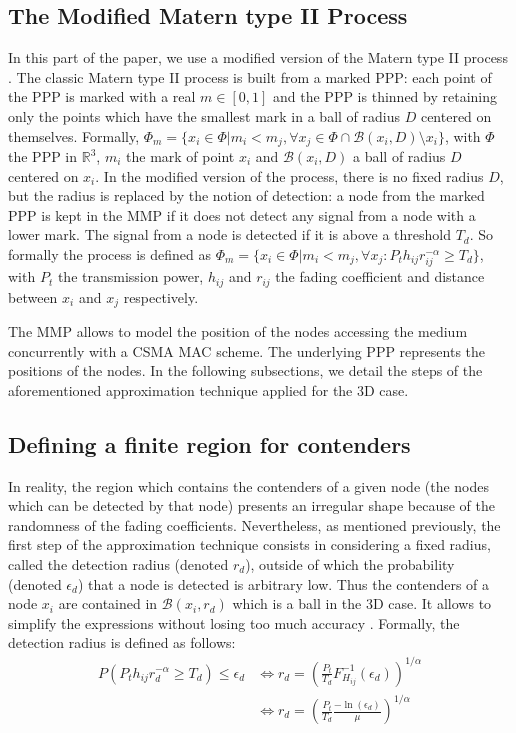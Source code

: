 \documentclass{sig-alternate-05-2015}
\begin{document}
\subsection{The Modified Matern type II Process}
\label{MMPmodelsec}

In this part of the paper, we use a modified version of the Matern type II process \cite{nguyen07}. The classic Matern type II process is built from a marked PPP: each point of the PPP is marked with a real $m\in [0,1]$ and the PPP is thinned by retaining only the points which have the smallest mark in a ball of radius $D$ centered on themselves. Formally, $\Phi_m = \{ x_i\in \Phi | m_{i} < m_{j}, \forall x_j \in \Phi \cap \mathcal{B}(x_i,D)\setminus x_i \}$, with $\Phi$ the PPP in $\mathbb{R}^3$, $m_i$ the mark of point $x_i$ and $\mathcal{B}(x_i,D)$ a ball of radius $D$ centered on $x_i$. In the modified version of the process, there is no fixed radius $D$, but the radius is replaced by the notion of detection: a node from the marked PPP is kept in the MMP if it does not detect any signal from a node with a lower mark. The signal from a node is detected if it is above a threshold $T_d$. So formally the process is defined as $\Phi_m = \{x_i\in \Phi | m_{i} < m_{j},  \forall x_j : P_t h_{ij} r_{ij}^{-\alpha} \geq T_d  \}$, with $P_t$ the transmission power, $h_{ij}$ and $r_{ij}$ the fading coefficient and distance between $x_i$ and $x_j$ respectively.

The MMP allows to model the position of the nodes accessing the medium concurrently with a CSMA MAC scheme. The underlying PPP represents the positions of the nodes. In the following subsections, we detail the steps of the aforementioned approximation technique applied for the 3D case.

\subsection{Defining a finite region for contenders}

In reality, the region which contains the contenders of a given node (the nodes which can be detected by that node) presents an irregular shape because of the randomness of the fading coefficients. Nevertheless, as mentioned previously, the first step of the approximation technique consists in considering a fixed radius, called the detection radius (denoted $r_d$), outside of which the probability (denoted $\epsilon_d$) that a node is detected is arbitrary low. Thus the contenders of a node $x_i$ are contained in $\mathcal{B}(x_i,r_d)$ which is a ball in the 3D case. It allows to simplify the expressions without losing too much accuracy \cite{elsawy13}. Formally, the detection radius is defined as follows:
\begin{align}
 P(P_th_{ij}r_d^{-\alpha}\geq T_d)\leq \epsilon_d & \Leftrightarrow r_d = \left(\frac{P_t}{T_d} F_{H_{ij}}^{-1}(\epsilon_d)\right)^{1/\alpha} \nonumber\\
 & \Leftrightarrow r_d = \left(\frac{P_t}{T_d} \frac{-\ln(\epsilon_d)}{\mu} \right)^{1/\alpha}
\end{align}
\end{document}
